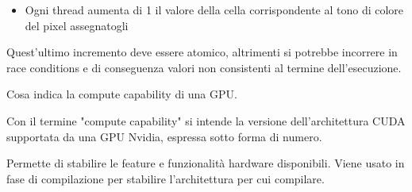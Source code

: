 \begin{questions}
\begin{solution}
\begin{itemize}
    		\item Ogni thread aumenta di 1 il valore della cella corrispondente al tono di colore del pixel assegnatogli
    	\end{itemize}
    	
    	Quest'ultimo incremento deve essere atomico, altrimenti si potrebbe incorrere in race conditions e di conseguenza valori non consistenti al termine dell'esecuzione.
    \end{solution}
    
    \question Cosa indica la compute capability di una GPU.
    
    \begin{solution}
        Con il termine "compute capability" si intende la versione dell'architettura CUDA supportata da una GPU Nvidia, espressa sotto forma di numero.
        
        Permette di stabilire le feature e funzionalità hardware disponibili. Viene usato in fase di compilazione per stabilire l'architettura per cui compilare.
    \end{solution}
    
\end{questions}